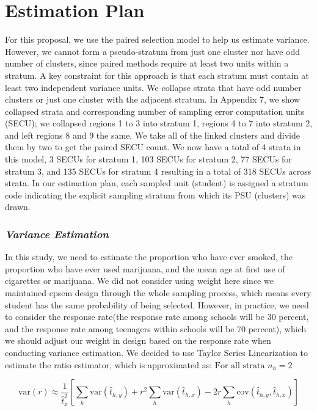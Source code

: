 \documentclass[
  12pt]{article}
\begin{document}
\section{Estimation Plan}\label{estimation-plan}

For this proposal, we use the paired selection model to help us estimate
variance. However, we cannot form a pseudo-stratum from just one cluster
nor have odd number of clusters, since paired methods require at least
two units within a stratum. A key constraint for this approach is that
each stratum must contain at least two independent variance units. We
collapse strata that have odd number clusters or just one cluster with
the adjacent stratum. In Appendix 7, we show collapsed strata and
corresponding number of sampling error computation units (SECU); we
collapsed regions 1 to 3 into stratum 1, regions 4 to 7 into stratum 2,
and left regions 8 and 9 the same. We take all of the linked clusters
and divide them by two to get the paired SECU count. We now have a total
of 4 strata in this model, 3 SECUs for stratum 1, 103 SECUs for stratum
2, 77 SECUs for stratum 3, and 135 SECUs for stratum 4 resulting in a
total of 318 SECUs across strata. In our estimation plan, each sampled
unit (student) is assigned a stratum code indicating the explicit
sampling stratum from which its PSU (clusters) was drawn.

\subsubsection{\texorpdfstring{\emph{Variance
Estimation}}{Variance Estimation}}\label{variance-estimation}

In this study, we need to estimate the proportion who have ever smoked,
the proportion who have ever used marijuana, and the mean age at first
use of cigarettes or marijuana. We did not consider using weight here
since we maintained epsem design through the whole sampling process,
which means every student has the same probability of being selected.
However, in practice, we need to consider the response rate(the response
rate among schools will be 30 percent, and the response rate among
teenagers within schools will be 70 percent), which we should adjust our
weight in design based on the response rate when conducting variance
estimation. We decided to use Taylor Series Linearization to estimate
the ratio estimator, which is approximated as:
\(\text{For all strata } n_h = 2\)

\[
\text{var}(r) \approx \frac{1}{\hat{t}_x^2} \left[ \sum_h \text{var}(\hat{t}_{h,y}) + r^2 \sum_h \text{var}(\hat{t}_{h,x}) - 2r \sum_h \text{cov}(\hat{t}_{h,y}, \hat{t}_{h,x}) \right]
\]
\end{document}
